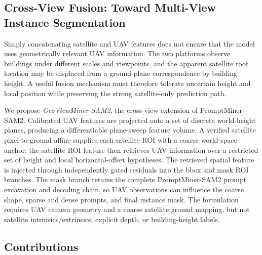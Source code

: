 \documentclass[letterpaper,journal]{IEEEtran}
\begin{document}
\subsection{Cross-View Fusion: Toward Multi-View Instance Segmentation}
Simply concatenating satellite and UAV features does not ensure that the model uses geometrically relevant UAV information. The two platforms observe buildings under different scales and viewpoints, and the apparent satellite roof location may be displaced from a ground-plane correspondence by building height. A useful fusion mechanism must therefore tolerate uncertain height and local position while preserving the strong satellite-only prediction path.

We propose \emph{GeoViewMiner-SAM2}, the cross-view extension of PromptMiner-SAM2. Calibrated UAV features are projected onto a set of discrete world-height planes, producing a differentiable plane-sweep feature volume. A verified satellite pixel-to-ground affine supplies each satellite ROI with a coarse world-space anchor; the satellite ROI feature then retrieves UAV information over a restricted set of height and local horizontal-offset hypotheses. The retrieved spatial feature is injected through independently gated residuals into the bbox and mask ROI branches. The mask branch retains the complete PromptMiner-SAM2 prompt excavation and decoding chain, so UAV observations can influence the coarse shape, sparse and dense prompts, and final instance mask. The formulation requires UAV camera geometry and a coarse satellite ground mapping, but not satellite intrinsics/extrinsics, explicit depth, or building-height labels.

\subsection{Contributions}
\end{document}
